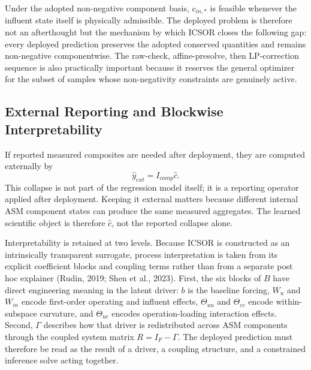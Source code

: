 \documentclass[a4paper,fleqn]{cas-sc}
\newenvironment{revblock}{}{}
\begin{document}
\begin{revblock}
Under the adopted non-negative component basis, $c_{in,*}$ is feasible whenever the influent state itself is physically admissible. The deployed problem is therefore not an afterthought but the mechanism by which ICSOR closes the following gap: every deployed prediction preserves the adopted conserved quantities and remains non-negative componentwise. The raw-check, affine-presolve, then LP-correction sequence is also practically important because it reserves the general optimizer for the subset of samples whose non-negativity constraints are genuinely active.

\subsection{External Reporting and Blockwise Interpretability}

If reported measured composites are needed after deployment, they are computed externally by
\begin{equation}
\label{eq:external-reporting}
\hat{y}_{ext} = I_{comp}\hat{c}.
\end{equation}
This collapse is not part of the regression model itself; it is a reporting operator applied after deployment. Keeping it external matters because different internal ASM component states can produce the same measured aggregates. The learned scientific object is therefore $\hat{c}$, not the reported collapse alone.

Interpretability is retained at two levels. Because ICSOR is constructed as an intrinsically transparent surrogate, process interpretation is taken from its explicit coefficient blocks and coupling terms rather than from a separate post hoc explainer (Rudin, 2019; Shen et al., 2023). First, the six blocks of $B$ have direct engineering meaning in the latent driver: $b$ is the baseline forcing, $W_u$ and $W_{in}$ encode first-order operating and influent effects, $\Theta_{uu}$ and $\Theta_{cc}$ encode within-subspace curvature, and $\Theta_{uc}$ encodes operation-loading interaction effects. Second, $\Gamma$ describes how that driver is redistributed across ASM components through the coupled system matrix $R = I_F - \Gamma$. The deployed prediction must therefore be read as the result of a driver, a coupling structure, and a constrained inference solve acting together.


\end{revblock}
\end{document}
